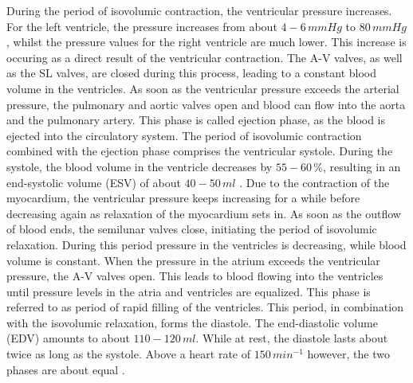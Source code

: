 During the period of isovolumic contraction, the ventricular pressure increases. For the left ventricle, the pressure increases from about $4-6 \, mmHg$ to $80 \, mmHg$, whilst the pressure values for the right ventricle are much lower. This increase is occuring as a direct result of the ventricular contraction. The A-V valves, as well as the SL valves, are closed during this process, leading to a constant blood volume in the ventricles. As soon as the ventricular pressure exceeds the arterial pressure, the pulmonary and aortic valves open and blood can flow into the aorta and the pulmonary artery. This phase is called ejection phase, as the blood is ejected into the circulatory system. The period of isovolumic contraction combined with the ejection phase comprises the ventricular systole. \cite{HKS4} During the systole, the blood volume in the ventricle decreases by $55-60 \, \%$, resulting in an end-systolic volume (ESV) of about $40-50 \, ml$ \cite{GH20}. Due to the contraction of the myocardium, the ventricular pressure keeps increasing for a while before decreasing again as relaxation of the myocardium sets in. As soon as the outflow of blood ends, the semilunar valves close, initiating the period of isovolumic relaxation. During this period pressure in the ventricles is decreasing, while blood volume is constant. When the pressure in the atrium exceeds the ventricular pressure, the A-V valves open. This leads to blood flowing into the ventricles until pressure levels in the atria and ventricles are equalized. \cite{HKS4} This phase is referred to as period of rapid filling of the ventricles. This period, in combination with the isovolumic relaxation, forms the diastole. The end-diastolic volume (EDV) amounts to about $110-120 \, ml$. \cite{GH20} While at rest, the diastole lasts about twice as long as the systole. Above a heart rate of $150 \, min^{-1}$ however, the two phases are about equal \cite{HKS4}.

